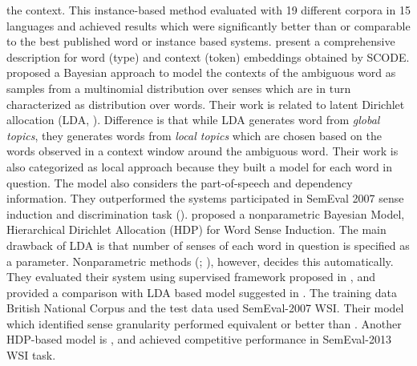 the context. This instance-based method evaluated with 19 different corpora in 15 languages and achieved results which were significantly better than or comparable to the best
published word or instance based systems. \cite{sert2013word} present a comprehensive description for word (type) and context (token) embeddings obtained by SCODE. \\


\cite{brody09bayesian} proposed a Bayesian approach to model the contexts of the ambiguous word as samples from a multinomial distribution over senses which are in turn characterized as distribution over words. Their work is related to latent Dirichlet allocation (LDA, \cite{blei03latent}). Difference is that while LDA generates word from \emph{global topics}, they generates words from \emph{local topics} which are chosen based on the words observed in a context window around the ambiguous word. Their work is also categorized as local approach because they built a model for each word in question. The model also considers the part-of-speech and dependency information. They outperformed the systems participated in SemEval 2007 sense induction and discrimination task (\cite{agirre07semeval}). \cite{yao11nonparametric} proposed a nonparametric Bayesian Model, Hierarchical Dirichlet Allocation (HDP) for Word Sense Induction. The main drawback of LDA is that number of senses of each word in question is specified as a parameter. Nonparametric methods (\cite{reisinger2010mixture}; \cite{vlachos2009unsupervised}), however, decides this automatically. They evaluated their system using supervised framework proposed in \cite{agirre07semeval}, and provided a comparison with LDA based model suggested in \cite{brody09bayesian}. The training data British National Corpus \cite{clear1993british} and the test data used SemEval-2007 WSI. Their model which identified sense granularity  performed equivalent or better than \cite{brody09bayesian}. Another HDP-based model is \cite{lau13word}, and achieved competitive performance in SemEval-2013 WSI task. \\

